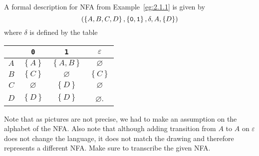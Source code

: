 \documentclass{notes}
\begin{document}
\begin{eg}
  A formal description for NFA from Example~\ref{eg:2.1.1} is given by 
  \[
    \left ( \left \{ A, B, C, D \right \}, \left \{ \verb~0~, \verb~1~ \right \}, \delta, A, \left \{ D \right \} \right )
  \]
  where $\delta$ is defined by the table 
  \begin{center}
    \begin{tabular}{c|ccc}
      & \verb~0~ & \verb~1~ & $\varepsilon$ \\ 
      \hline
      $A$ & $\left \{ A \right \}$ & $\left \{ A, B \right \}$ & $\varnothing$ \\ 
      $B$ & $\left \{ C \right \}$ & $\varnothing$ & $\left \{ C \right \}$ \\ 
      $C$ & $\varnothing$ & $\left \{ D \right \}$ & $\varnothing$ \\ 
      $D$ & $\left \{ D \right \}$ & $\left \{ D \right \}$ & $\varnothing$.
    \end{tabular}
  \end{center}
  
  Note that as pictures are not precise, we had to make an assumption on the alphabet of the NFA.
  Also note that although adding transition from $A$ to $A$ on $\varepsilon$ does not change the language, it does not match the drawing and therefore represents a different NFA.
  Make sure to transcribe the given NFA.
\end{eg}
\end{document}
